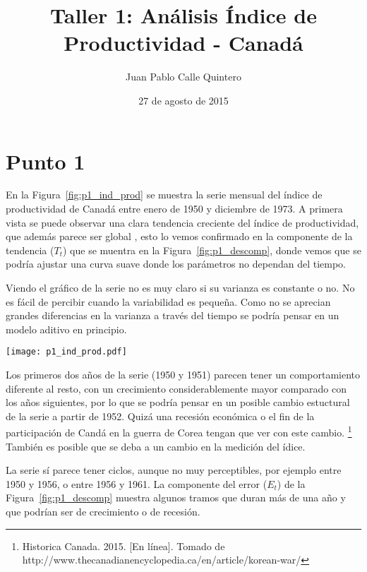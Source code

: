 \documentclass{tufte-handout}
\title{Taller 1: Análisis Índice de Productividad - Canadá}
\author{Juan Pablo Calle Quintero}
\date{27 de agosto de 2015}
\begin{document}
\maketitle

\section*{Punto 1}

En la Figura~\ref{fig:p1_ind_prod} se muestra la serie mensual del índice de productividad de Canadá entre enero de 1950 y diciembre de 1973. A primera vista se puede observar una clara tendencia creciente del índice de productividad, que además parece ser global , esto lo vemos confirmado en la componente de la tendencia ($T_t$) que se muentra en la Figura~\ref{fig:p1_descomp}, donde vemos que se podría ajustar una curva suave donde los parámetros no dependan del tiempo.

Viendo el gráfico de la serie no es muy claro si su varianza es constante o no. No es fácil de percibir cuando la variabilidad es pequeña. Como no se aprecian grandes diferencias en la varianza a través del tiempo se podría pensar en un modelo aditivo en principio.

\begin{figure*}[!h]
    \texttt{[image: p1\_ind\_prod.pdf]}
    \caption{Serie de tiempo del índice de productividad de Canadá desde enero de 1950 hasta diciembre de 1973. Son 288 observaciones en 24 años.}
    \label{fig:p1_ind_prod}
\end{figure*}

Los primeros dos años de la serie (1950 y 1951) parecen tener un comportamiento diferente al resto, con un crecimiento considerablemente mayor comparado con los años siguientes, por lo que se podría pensar en un posible cambio estuctural de la serie a partir de 1952. Quizá una recesión económica o el fin de la participación de Candá en la guerra de Corea tengan que ver con este cambio. \footnote{Historica Canada. 2015. [En línea]. Tomado de http://www.thecanadianencyclopedia.ca/en/article/korean-war/} También es posible que se deba a un cambio en la medición del ídice.

La serie sí parece tener ciclos, aunque no muy perceptibles, por ejemplo entre 1950 y 1956, o entre 1956 y 1961. La componente del error ($E_t$) de la Figura~\ref{fig:p1_descomp} muestra algunos tramos que duran más de una año y que podrían ser de crecimiento o de recesión.
\end{document}
